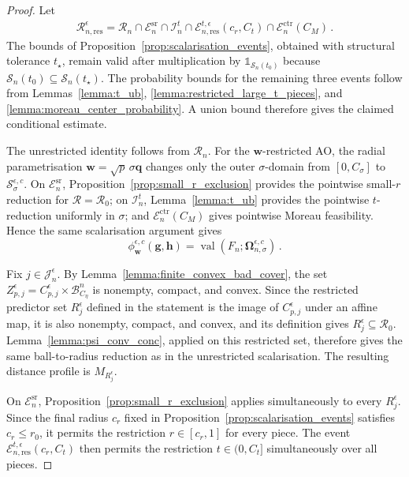 \documentclass{article}
\theoremstyle{definition}
\newcommand*{\bb}{\boldsymbol}
\def\bw {\bb{w}}
\def\bh{\bb{h}}
\def\bg{\bb{g}}
\begin{document}
\begin{bibunit}
\begin{proof}
Let
$$
\begin{aligned}
    \mathcal R_{n,\mathrm{res}}^\epsilon
    =
    \mathcal R_n
    \cap
    \mathcal E_n^{\mathrm{sr}}
    \cap
    \mathcal I_n^t
    \cap
    \mathcal E_{n,\mathrm{res}}^{t,\epsilon}(c_r,C_t)
    \cap
    \mathcal E_n^{\mathrm{ctr}}(C_M)\,.
\end{aligned}
$$
The bounds of Proposition~\ref{prop:scalarisation_events}, obtained with
structural tolerance $t_\star$, remain valid after multiplication by
$\mathds{1}_{\mathcal S_n(t_0)}$ because
$\mathcal S_n(t_0)\subseteq\mathcal S_n(t_\star)$. The probability bounds
for the remaining three events follow from Lemmas~\ref{lemma:t_ub},
\ref{lemma:restricted_large_t_pieces}, and
\ref{lemma:moreau_center_probability}. A union bound therefore gives the
claimed conditional estimate.

The unrestricted identity follows from $\mathcal R_n$. For the
$\bw$-restricted AO, the radial parametrisation
$\bw=\sqrt p\,\sigma\bb q$ changes only the outer $\sigma$-domain from
$[0,C_\sigma]$ to $\mathcal S_\sigma^{\epsilon,c}$. On
$\mathcal E_n^{\mathrm{sr}}$, Proposition~\ref{prop:small_r_exclusion}
provides the pointwise small-$r$ reduction for
$\mathcal R=\mathcal R_0$; on $\mathcal I_n^t$,
Lemma~\ref{lemma:t_ub} provides the pointwise $t$-reduction uniformly in
$\sigma$; and $\mathcal E_n^{\mathrm{ctr}}(C_M)$ gives pointwise Moreau
feasibility. Hence the same scalarisation argument gives
$$
    \phi_{\bw}^{\epsilon,c}(\bg,\bh)
    =
    \operatorname{val}
    \left(
        F_n;
        \bb\Omega_{n,\sigma}^{\epsilon,c}
    \right)\,.
$$

Fix $j\in\mathcal J_n^\epsilon$. By
Lemma~\ref{lemma:finite_convex_bad_cover}, the set
$Z_{p,j}^\epsilon=C_{p,j}^\epsilon\times\mathcal B^n_{C_\eta}$ is
nonempty, compact, and convex. Since the restricted predictor set
$R_j^\epsilon$ defined in the statement is the image of
$C_{p,j}^\epsilon$ under an affine map, it is also nonempty, compact, and
convex, and its definition gives $R_j^\epsilon\subseteq\mathcal R_0$.
Lemma~\ref{lemma:psi_conv_conc}, applied on this restricted set, therefore
gives the same ball-to-radius reduction as
in the unrestricted scalarisation. The resulting distance profile is
$M_{R_j^\epsilon}$.

On $\mathcal E_n^{\mathrm{sr}}$, Proposition~\ref{prop:small_r_exclusion}
applies simultaneously to every $R_j^\epsilon$. Since the final radius
$c_r$ fixed in Proposition~\ref{prop:scalarisation_events} satisfies
$c_r\leq r_0$, it permits the restriction
$r\in[c_r,1]$ for every piece. The event
$\mathcal E_{n,\mathrm{res}}^{t,\epsilon}(c_r,C_t)$ then permits the
restriction $t\in(0,C_t]$ simultaneously over all pieces.


\end{proof}
\end{bibunit}
\end{document}
